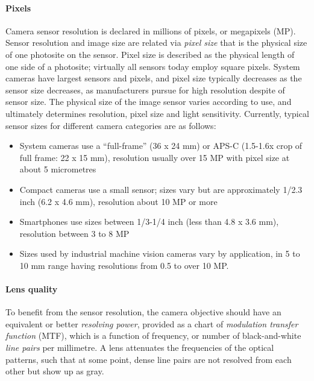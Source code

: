 
\paragraph{Pixels}
Camera sensor resolution is declared in millions of pixels, or megapixels (MP).
Sensor resolution and image size are related via \emph{pixel size} that is the physical size of one photosite on the sensor.
Pixel size is described as the physical length of one side of a photosite; virtually all sensors today employ square pixels.
System cameras have largest sensors and pixels, and pixel size typically decreases as the sensor size decreases, as manufacturers pursue for high resolution despite of sensor size.
The physical size of the image sensor varies according to use, and ultimately determines resolution, pixel size and light sensitivity.
Currently, typical sensor sizes for different camera categories are as follows:

\begin{itemize}
	\item System cameras use a ``full-frame'' (36 x 24 mm) or APS-C (1.5-1.6x crop of full frame: 22 x 15 mm), resolution usually over 15 MP with pixel size at about 5 micrometres
	\item Compact cameras use a small sensor; sizes vary but are approximately 1/2.3 inch (6.2 x 4.6 mm), resolution about 10 MP or more
	\item Smartphones use sizes between 1/3-1/4 inch (less than 4.8 x 3.6 mm), resolution between 3 to 8 MP
	\item Sizes used by industrial machine vision cameras vary by application, in 5 to 10 mm range having resolutions from 0.5 to over 10 MP.
\end{itemize}



\paragraph{Lens quality}
To benefit from the sensor resolution, the camera objective should have an equivalent or better \emph{resolving power}, provided as a chart of \emph{modulation transfer function} (MTF), which is a function of frequency, or number of black-and-white \emph{line pairs} per millimetre.
A lens attenuates the frequencies of the optical patterns, such that at some point, dense line pairs are not resolved from each other but show up as gray.
\cite[p.~71]{kingslake1992optics}


